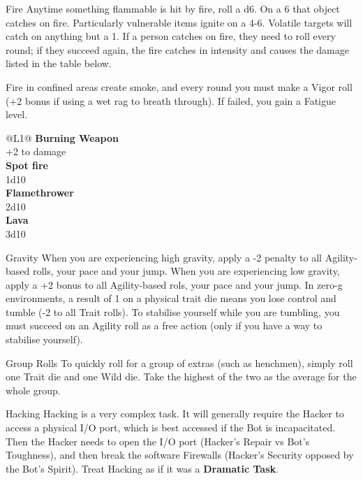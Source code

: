 \begin{genericsection}{Fire}
Anytime something flammable is hit by fire, roll a d6. On a 6 that object catches on fire. Particularly vulnerable items ignite on a 4-6. Volatile targets will catch on anything but a 1. If a person catches on fire, they need to roll every round; if they succeed again, the fire catches in intensity and causes the damage listed in the table below.

Fire in confined areas create smoke, and every round you must make a Vigor roll (+2 bonus if using a wet rag to breath through). If failed, you gain a Fatigue level.

\begin{redtable}{\linewidth}{@{}L{1}@{}}
  \textbf{Burning Weapon}\\
  +2 to damage\\
  \textbf{Spot fire}\\
  1d10\\
  \textbf{Flamethrower}\\
  2d10\\
  \textbf{Lava}\\
  3d10\\
\end{redtable}
\end{genericsection}

\begin{genericsection}{Gravity}
When you are experiencing high gravity, apply a -2 penalty to all Agility-based rolls, your pace and your jump. When you are experiencing low gravity, apply a +2 bonus to all Agility-based rols, your pace and your jump. In zero-g environments, a result of 1 on a physical trait die means you lose control and tumble (-2 to all Trait rolls). To stabilise yourself while you are tumbling, you must succeed on an Agility roll as a free action (only if you have a way to stabilise yourself).
\end{genericsection}

\begin{genericsection}{Group Rolls}
To quickly roll for a group of extras (such as henchmen), simply roll one Trait die and one Wild die. Take the highest of the two as the average for the whole group.
\end{genericsection}

\begin{genericsection}{Hacking} 
Hacking is a very complex task. It will generally require the Hacker to access a physical I/O port, which is best accessed if the Bot is incapacitated. Then the Hacker needs to open the I/O port (Hacker's Repair vs Bot's Toughness), and then break the software Firewalls (Hacker's Security opposed by the Bot's Spirit). Treat Hacking as if it was a \textbf{Dramatic Task}.
\end{genericsection}

